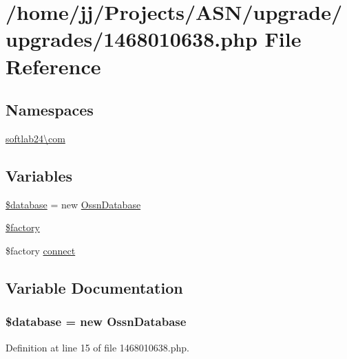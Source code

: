 \hypertarget{1468010638_8php}{}\section{/home/jj/\+Projects/\+A\+S\+N/upgrade/upgrades/1468010638.php File Reference}
\label{1468010638_8php}
\subsection*{Namespaces}
\begin{DoxyCompactItemize}
\item 
 \hyperlink{namespacesoftlab24_1_1com}{softlab24\textbackslash{}com}
\end{DoxyCompactItemize}
\subsection*{Variables}
\begin{DoxyCompactItemize}
\item 
\hyperlink{1468010638_8php_a7691c0162d89de0b6ba47edcd8ba8878}{\$database} = new \hyperlink{class_ossn_database}{Ossn\+Database}
\item 
\hyperlink{1468010638_8php_a099b374dc664ee043fffcd6ea05e3e70}{\$factory}
\item 
\$factory \hyperlink{1468010638_8php_a3fdbedd7713e458f25fcf7dc1f562a3d}{connect}
\end{DoxyCompactItemize}


\subsection{Variable Documentation}
\subsubsection[{\texorpdfstring{\$database}{$database}}]{\setlength{\rightskip}{0pt plus 5cm}\${\bf database} = new {\bf Ossn\+Database}}\hypertarget{1468010638_8php_a7691c0162d89de0b6ba47edcd8ba8878}{}\label{1468010638_8php_a7691c0162d89de0b6ba47edcd8ba8878}


Definition at line 15 of file 1468010638.\+php.

